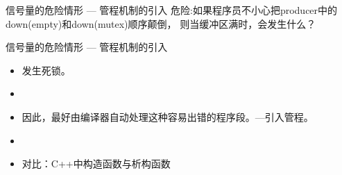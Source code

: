 \documentclass[xcolor=svgnames]{beamer}
\begin{document}
\begin{CJK*}{UTF8}{gbsn}
\begin{frame}{信号量的危险情形 --- 管程机制的引入}
\alert{危险:}如果程序员不小心把producer中的down(empty)和down(mutex)顺序颠倒，
则当缓冲区满时，会发生什么？
\end{frame}

\begin{frame}{信号量的危险情形 --- 管程机制的引入}
\begin{itemize}
\item 发生死锁。
\item[]
\item 因此，最好由编译器自动处理这种容易出错的程序段。---引入管程。
\item[]
\item 对比：C++中构造函数与析构函数
\end{itemize}
\end{frame}

\end{CJK*}
\end{document}
